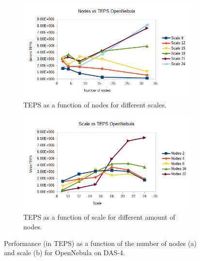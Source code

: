 \begin{figure}[!h]
\centering
\begin{subfigure}{.5\textwidth}
  \centering
  \includegraphics[width=\linewidth]{images/nodes_opennebula.png}
  \caption{TEPS as a function of nodes for different scales.}
  \label{fig:nodes_opennebula}
\end{subfigure}%
\begin{subfigure}{.5\textwidth}
  \centering
  \includegraphics[width=\linewidth]{images/scale_opennebula.png}
  \caption{TEPS as a function of scale for different amount of nodes.}
  \label{fig:scale_opennebula}
\end{subfigure}
\caption{Performance (in TEPS) as a function of the number of nodes (a) and scale (b) for OpenNebula on DAS-4.}
\label{fig:das_opennebula}
\end{figure}

